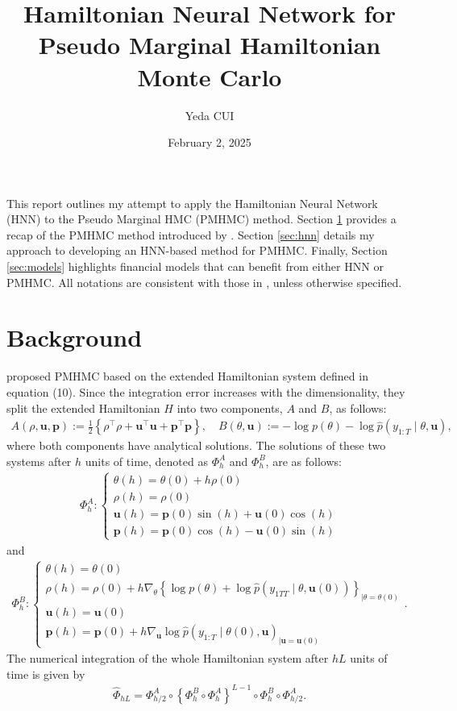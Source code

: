 \documentclass[11pt,a4paper]{article}
\title{Hamiltonian Neural Network for Pseudo Marginal Hamiltonian Monte Carlo}
\author{Yeda CUI}
\date{February 2, 2025}
\theoremstyle{remark}
\begin{document}
\maketitle

This report outlines my attempt to apply the Hamiltonian Neural Network (HNN) to the Pseudo Marginal HMC (PMHMC) method. Section \ref{sec:background} provides a recap of the PMHMC method introduced by \cite{alenlov2021pseudo}. Section \ref{sec:hnn} details my approach to developing an HNN-based method for PMHMC. Finally, Section \ref{sec:models} highlights financial models that can benefit from either HNN or PMHMC. All notations are consistent with those in \cite{alenlov2021pseudo}, unless otherwise specified.
\section{Background}
\label{sec:background}
\cite{alenlov2021pseudo} proposed PMHMC based on the extended Hamiltonian system defined in equation (10). Since the integration error increases with the dimensionality, they split the extended Hamiltonian $H$ into two components, $A$ and $B$, as follows: 
\begin{align}
	A(\rho, \mathbf{u}, \mathbf{p}):=\frac{1}{2}\left\{\rho^{\top} \rho+\mathbf{u}^{\top} \mathbf{u}+\mathbf{p}^{\top} \mathbf{p}\right\}, \quad B(\theta, \mathbf{u}):=-\log p(\theta)-\log \hat{p}\left(y_{1: T} \mid \theta, \mathbf{u}\right) ,
\end{align}
where both components have analytical solutions. The solutions of these two systems after $h$ units of time, denoted as $\Phi_h^A$ and $\Phi_h^B$, are as follows:
\begin{align}
	\Phi_h^A:\left\{\begin{array}{l}
\theta(h)=\theta(0)+h \rho(0) \\
\rho(h)=\rho(0) \\
\mathbf{u}(h)=\mathbf{p}(0) \sin (h)+\mathbf{u}(0) \cos (h) \\
\mathbf{p}(h)=\mathbf{p}(0) \cos (h)-\mathbf{u}(0) \sin (h)
\end{array}\right.
\end{align}
and
\begin{align}
\label{eq:phiB}
	\Phi_h^B:\left\{\begin{array}{l}
\theta(h)=\theta(0) \\
\rho(h)=\rho(0)+h \nabla_\theta\left\{\log p(\theta)+\log \hat{p}\left(y_{1 T T} \mid \theta, \mathbf{u}(0)\right)\right\}_{\mid \theta=\theta(0)} \\
\mathbf{u}(h)=\mathbf{u}(0) \\
\mathbf{p}(h)=\mathbf{p}(0)+h \nabla_{\mathbf{u}} \log \hat{p}\left(y_{1: T} \mid \theta(0), \mathbf{u}\right)_{\mid \mathbf{u}=\mathbf{u}(0)}
\end{array}\right. .
\end{align}
The numerical integration of the whole Hamiltonian system after $hL$ units of time is given by 
\begin{align}
	\hat{\Phi}_{h L}=\Phi_{h / 2}^A \circ\left\{\Phi_h^B \circ \Phi_h^A\right\}^{L-1} \circ \Phi_h^B \circ \Phi_{h / 2}^A.
\end{align}
\end{document}
